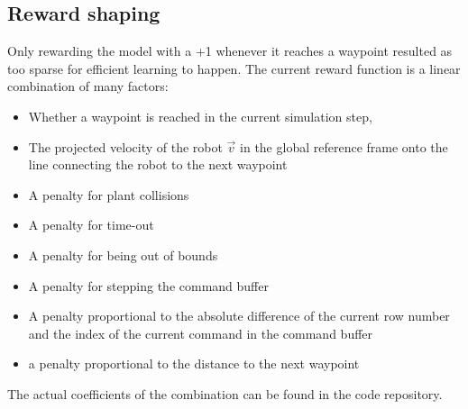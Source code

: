 \documentclass[11pt,a4paper,twocolumn]{article}
\begin{document}
\subsection{Reward shaping}
Only rewarding the model with a +1 whenever it reaches a waypoint resulted as too sparse for efficient learning to happen. The current reward function is a linear combination of many factors:
\begin{itemize}
    \item Whether a waypoint is reached in the current simulation step,
    \item The projected velocity of the robot $\vec{v}$ in the global reference frame onto the line connecting the robot to the next waypoint 
    \item A penalty for plant collisions
    \item A penalty for time-out
    \item A penalty for being out of bounds
    \item A penalty for stepping the command buffer
    \item A penalty proportional to the absolute difference of the current row number and the index of the current command in the command buffer
    \item a penalty proportional to the distance to the next waypoint
    
\end{itemize}

The actual coefficients of the combination can be found in the code repository.
\end{document}
